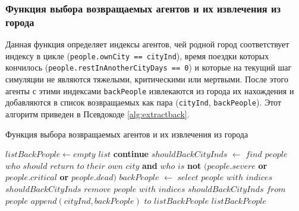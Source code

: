 \documentclass[a4paper,12pt]{article} %
\begin{document}
\subsubsection{Функция выбора возвращаемых агентов и их извлечения из города}

Данная функция определяет индексы агентов, чей родной город соответствует индексу в цикле (\texttt{people.ownCity == cityInd}), время поездки которых кончилось (\texttt{people.restInAnotherCityDays == 0}) и которые на текущий шаг симуляции не являются тяжелыми, критическими или мертвыми. После этого агенты с этими индексами \texttt{backPeople} извлекаются из города их нахождения и добавляются в список возвращаемых как пара (\texttt{cityInd}, \texttt{backPeople}). Этот алгоритм приведен в Псевдокоде \ref{alg:extractback}.

\begin{algorithm}[H]
\caption{Функция выбора возвращаемых агентов и их извлечения из города}
\label{alg:extractback}
\begin{algorithmic}[1]
	\State \(listBackPeople \gets empty \) \(list\)
			\State \textbf{continue}
		\EndIf
		\State \(shouldBackCityInds\) \(\gets\) \(find\) \(people\) \(who\) \(should\) \(return\) \(to\) \(their\) \(own\) \(city\) \textbf{and} \(who\) \(is\) \textbf{not} \( (people.severe \) \textbf{or} \( people.critical \) \textbf{or} \( people.dead) \)
		\State \(backPeople\) \(\gets\) \(select\) \(people\) \(with\) \(indices\) \(shouldBackCityInds\)
		\State \(remove\) \(people\) \(with\) \(indices\) \(shouldBackCityInds\) \(from\) \(people\)
		\State \(append(cityInd, backPeople)\) \(to\) \(listBackPeople\)
	\EndFor
	\State \Return \(listBackPeople\)
\EndFunction 
\end{algorithmic}
\end{algorithm}






\end{document}
